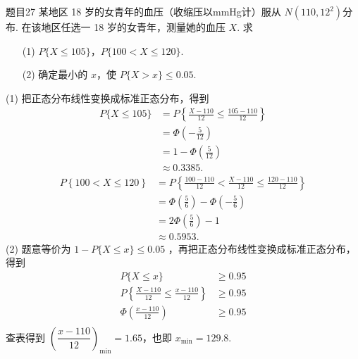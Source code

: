 \begin{question}{题目27}
    某地区 18 岁的女青年的血压（收缩压以mmHg计）服从 $N(110,12^2)$分布. 在该地区任选一 18 岁的女青年，测量她的血压 $X$. 求
    \begin{itemize}
        \item[(1)] $P\{X \leqslant 105\}$，$P\{100 < X \leqslant 120\}$.
        \item[(2)] 确定最小的 $x$，使 $P\{X>x\} \leqslant 0.05$.
    \end{itemize}
\end{question}
\begin{solution}
    (1) 把正态分布线性变换成标准正态分布，得到
    $$
        \begin{aligned}
            P\{X \leqslant 105\}
             & = P\left\{\frac{X-110}{12} \leqslant \frac{105-110}{12}\right\} \\
             & = \Phi\left(-\frac{5}{12}\right)                                \\
             & = 1 - \Phi\left(\frac{5}{12}\right)                             \\
             & \approx 0.3385.
        \end{aligned}
    $$
    $$
        \begin{aligned}
            P\left\{100 < X \leqslant 120\right\}
             & = P\left\{\frac{100-110}{12} < \frac{X-110}{12} \leqslant \frac{120-110}{12}\right\} \\
             & = \Phi\left(\frac{5}{6}\right) - \Phi\left(-\frac{5}{6}\right)                       \\
             & = 2\Phi\left(\frac{5}{6}\right) - 1                                                  \\
             & \approx 0.5953.
        \end{aligned}
    $$
    (2) 题意等价为 $1 - P\{X \leqslant x\} \leqslant 0.05$ ，再把正态分布线性变换成标准正态分布，得到
    $$
        \begin{aligned}
            P\{X \leqslant x\}                                          & \geqslant 0.95 \\
            P\left\{\frac{X-110}{12} \leqslant \frac{x-110}{12}\right\} & \geqslant 0.95 \\
            \Phi\left(\frac{x-110}{12}\right)                           & \geqslant 0.95 \\
        \end{aligned}
    $$
    查表得到 $\left(\dfrac{x-110}{12}\right)_{\min} = 1.65$，也即 $x_{\min} = 129.8$.
\end{solution}

